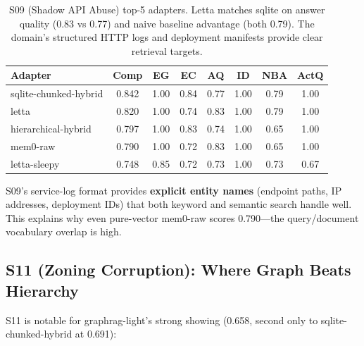 \documentclass[11pt,letterpaper]{article}
\begin{document}
\begin{table}[H]
\centering
\small
\begin{tabular}{lccccccc}
\toprule
\textbf{Adapter} & \textbf{Comp} & \textbf{EG} & \textbf{EC} & \textbf{AQ} & \textbf{ID} & \textbf{NBA} & \textbf{ActQ} \\
\midrule
\rowcolor{toprow}
sqlite-chunked-hybrid & 0.842 & 1.00 & 0.84 & 0.77 & 1.00 & 0.79 & 1.00 \\
letta & 0.820 & 1.00 & 0.74 & 0.83 & 1.00 & 0.79 & 1.00 \\
hierarchical-hybrid & 0.797 & 1.00 & 0.83 & 0.74 & 1.00 & 0.65 & 1.00 \\
mem0-raw & 0.790 & 1.00 & 0.72 & 0.83 & 1.00 & 0.65 & 1.00 \\
letta-sleepy & 0.748 & 0.85 & 0.72 & 0.73 & 1.00 & 0.73 & 0.67 \\
\bottomrule
\end{tabular}
\caption{S09 (Shadow API Abuse) top-5 adapters. Letta matches sqlite on answer quality (0.83 vs 0.77) and naive baseline advantage (both 0.79). The domain's structured HTTP logs and deployment manifests provide clear retrieval targets.}
\label{tab:s09-detail}
\end{table}

S09's service-log format provides \textbf{explicit entity names} (endpoint paths, IP addresses, deployment IDs) that both keyword and semantic search handle well. This explains why even pure-vector mem0-raw scores 0.790---the query/document vocabulary overlap is high.

\subsection{S11 (Zoning Corruption): Where Graph Beats Hierarchy}

S11 is notable for graphrag-light's strong showing (0.658, second only to sqlite-chunked-hybrid at 0.691):
\end{document}
